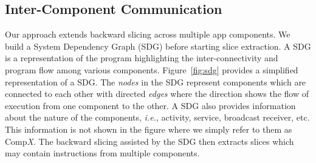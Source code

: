 \subsection{Inter-Component Communication}

Our approach extends backward slicing across multiple app components. We build a System Dependency Graph (SDG) before starting slice extraction. A SDG is a representation of the program highlighting the inter-connectivity and program flow among various components. Figure~\ref{fig:sdg} provides a simplified representation of a SDG. The \textit{nodes} in the SDG represent components which are connected to each other with directed \textit{edges} where the direction shows the flow of execution from one component to the other. A SDG also provides information about the nature of the components, \textit{i.e.}, activity, service, broadcast receiver, etc. This information is not shown in the figure where we simply refer to them as Comp\textit{X}. The backward slicing assisted by the SDG then extracts slices which may contain instructions from multiple components. 

\iffalse
\begin{figure}[ht!]
\centering

\label{fig:slices}
\caption{Extracted and Refined Slice}
\label{fig:slices}
\end{figure}
\fi




